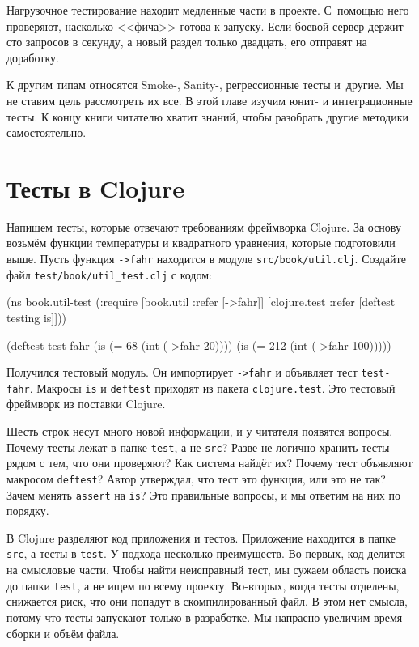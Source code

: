 
Нагрузочное тестирование находит медленные части в проекте. С~помощью него
проверяют, насколько <<фича>> готова к запуску. Если боевой сервер держит сто
запросов в секунду, а новый раздел только двадцать, его отправят на доработку.

К другим типам относятся Smoke-, Sanity-, регрессионные тесты и~другие. Мы не
ставим цель рассмотреть их все. В этой главе изучим юнит- и интеграционные
тесты. К концу книги читателю хватит знаний, чтобы разобрать другие методики
самостоятельно.

\section{Тесты в Clojure}

Напишем тесты, которые отвечают требованиям фреймворка Clojure. За основу
возьмём функции температуры и квадратного уравнения, которые подготовили
выше. Пусть функция \verb|->fahr| находится в модуле
\verb|src/book/util.clj|. Создайте файл \verb|test/book/util_test.clj| с кодом:


\begin{english}
  \begin{clojure}
(ns book.util-test
  (:require [book.util :refer [->fahr]]
            [clojure.test :refer [deftest testing is]]))

(deftest test-fahr
  (is (= 68 (int (->fahr 20))))
  (is (= 212 (int (->fahr 100)))))
  \end{clojure}
\end{english}

Получился тестовый модуль. Он импортирует \verb|->fahr| и объявляет тест
\verb|test-fahr|. Макросы \verb|is| и \verb|deftest| приходят из пакета
\verb|clojure.test|. Это тестовый фреймворк из поставки Clojure.

Шесть строк несут много новой информации, и у читателя появятся вопросы. Почему
тесты лежат в папке \verb|test|, а не \verb|src|? Разве не логично хранить тесты
рядом с тем, что они проверяют? Как система найдёт их?  Почему тест объявляют
макросом \verb|deftest|? Автор утверждал, что тест это функция, или это не так?
Зачем менять \verb|assert| на \verb|is|? Это правильные вопросы, и мы ответим на
них по порядку.

В Clojure разделяют код приложения и тестов. Приложение находится в папке
\verb|src|, а тесты в \verb|test|. У подхода несколько
преимуществ. Во-первых, код делится на смысловые части. Чтобы найти неисправный
тест, мы сужаем область поиска до папки \verb|test|, а не ищем по всему
проекту. Во-вторых, когда тесты отделены, снижается риск, что они попадут в
скомпилированный файл. В этом нет смысла, потому что тесты запускают только в
разработке. Мы напрасно увеличим время сборки и объём файла.

